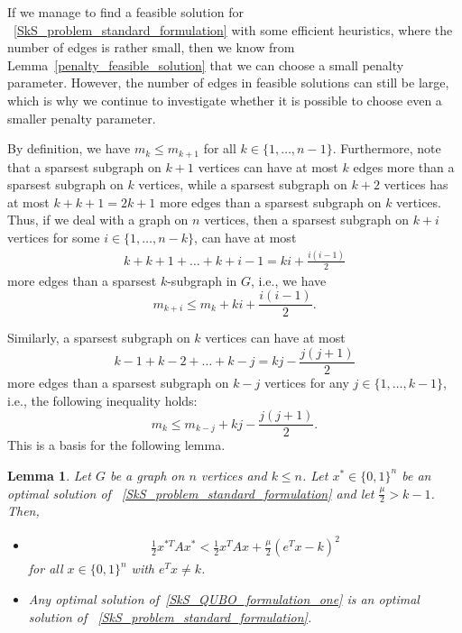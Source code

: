 \documentclass{article}
\newtheorem{lem}[thm]{Lemma}
\begin{document}
If we manage to find a feasible solution for ~\eqref{SkS_problem_standard_formulation} with some efficient heuristics, where the number of edges is rather small, then we know from Lemma~\ref{penalty_feasible_solution} that we can choose a small penalty parameter. However, the number of edges in feasible solutions can still be large, which is why we continue to investigate whether it is possible to choose even a smaller penalty parameter.

By definition, we have  $m_k \leq m_{k+1}$ for all $k \in \{1, \ldots, n-1\}$. Furthermore, note that a sparsest subgraph on $k+1$ vertices can have at most $k$ edges more than a sparsest subgraph on $k$ vertices, while a sparsest subgraph on $k+2$ vertices has at most $k + k + 1 = 2k + 1$ more edges than a sparsest subgraph on $k$ vertices. Thus, if we deal with a graph on $n$ vertices, then a sparsest subgraph on $k+i$ vertices for some $i \in \{1, \ldots, n-k\}$, can have at most 
\begin{align*}
k + k + 1 + \ldots + k + i - 1 = ki + \frac{i(i-1)}{2}
\end{align*}
more edges than a sparsest $k$-subgraph in $G$, i.e., we have
\begin{equation}\label{eq:m_k_1}
m_{k+i}\le m_k+ki + \frac{i(i-1)}{2}.
\end{equation}

Similarly, a sparsest subgraph on $k$ vertices can have at most 
\begin{equation*} 
k - 1 + k - 2 + \ldots + k - j = kj - \frac{j(j+1)}{2}
\end{equation*}
more edges than a sparsest subgraph on $k-j$ vertices for any $j \in \{1, \ldots, k - 1\}$, i.e., the following inequality holds:
\begin{equation}\label{eq:m_k_2}
m_{k}\le m_{k-j}+kj - \frac{j(j+1)}{2}.
\end{equation}
This is a basis for the following lemma.\\

\begin{lem}\label{lemma_k_minus_1}
Let $G$ be a graph on $n$ vertices and $k \leq n$. Let $x^* \in \{0, 1\}^n$ be an optimal solution of ~\eqref{SkS_problem_standard_formulation} and let $\frac{\mu}{2} > k - 1$. Then,
\begin{itemize}
    \item [(i)]
\begin{align}\label{relation_k_minus_1_exact}
\frac{1}{2} x^{*T} A x^* < \frac{1}{2} x^T A x + \frac{\mu}{2}(e^Tx - k)^2
\end{align}
for all $x \in \{0, 1\}^n$ with $e^Tx \neq k$. 
    \item [(ii)] Any  optimal solution of~\eqref{SkS_QUBO_formulation_one}  is an optimal solution of ~\eqref{SkS_problem_standard_formulation}.
\end{itemize}
\end{lem} 
\end{document}
